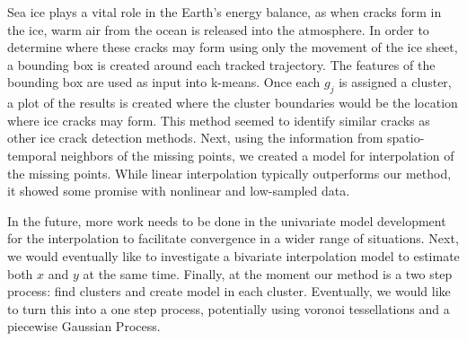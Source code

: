 \documentclass[12pt]{article}
\begin{document}
Sea ice plays a vital role in the Earth's energy balance, as when cracks
form in the ice, warm air from the ocean is released into the
atmosphere. In order to determine where these cracks may form using only
the movement of the ice sheet, a bounding box is created around each
tracked trajectory. The features of the bounding box are used as input
into k-means. Once each \(g_j\) is assigned a cluster, a plot of the
results is created where the cluster boundaries would be the location
where ice cracks may form. This method seemed to identify similar cracks
as other ice crack detection methods. Next, using the information from
spatio-temporal neighbors of the missing points, we created a model for
interpolation of the missing points. While linear interpolation
typically outperforms our method, it showed some promise with nonlinear
and low-sampled data.

In the future, more work needs to be done in the univariate model
development for the interpolation to facilitate convergence in a wider
range of situations. Next, we would eventually like to investigate a
bivariate interpolation model to estimate both \(x\) and \(y\) at the
same time. Finally, at the moment our method is a two step process: find
clusters and create model in each cluster. Eventually, we would like to
turn this into a one step process, potentially using voronoi
tessellations and a piecewise Gaussian Process.



\end{document}
